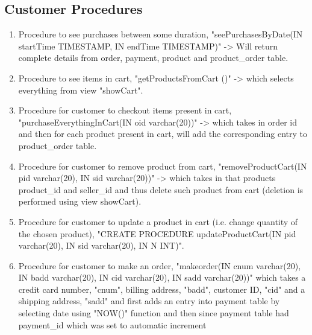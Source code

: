 \documentclass[a4paper,12pt]{article}
\begin{document}
\subsection{Customer Procedures}
\begin{enumerate}
  \item Procedure to see purchases between some duration, "seePurchasesByDate(IN startTime TIMESTAMP, IN endTime TIMESTAMP)" -> Will return complete details from order, payment, product and product\_order table.
  \item Procedure to see items in cart, "getProductsFromCart ()" -> which selects everything from view "showCart".
  \item Procedure for customer to checkout items present in cart, "purchaseEverythingInCart(IN oid varchar(20))" -> which takes in order id and then for each product present in cart, will add the corresponding entry to product\_order table.
  \item Procedure for customer to remove product from cart, "removeProductCart(IN pid varchar(20), IN sid varchar(20))" -> which takes in that products product\_id and seller\_id and thus delete such product from cart (deletion is performed using view showCart).
  \item Procedure for customer to update a product in cart (i.e. change quantity of the chosen product), "CREATE PROCEDURE updateProductCart(IN pid varchar(20), IN sid varchar(20), IN N INT)".
  \item Procedure for customer to make an order, "makeorder(IN cnum varchar(20), IN badd varchar(20), IN cid varchar(20), IN sadd varchar(20))" which takes a credit card number, "cnum", billing address, "badd", customer ID, "cid" and a shipping address, "sadd" and first adds an entry into payment table by selecting date using "NOW()" function and then since payment table had payment\_id which was set to automatic increment 
\end{enumerate}
\end{document}
